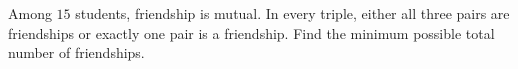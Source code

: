 Among $15$ students, friendship is mutual. In every triple, either all three pairs are friendships or exactly one pair is a friendship. Find the minimum possible total number of friendships.
